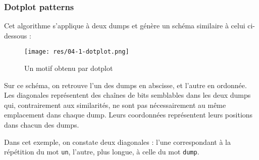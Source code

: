 \subsubsection{Dotplot patterns}

Cet algorithme s'applique à deux dumps et génère un schéma similaire à celui ci-dessous :

\begin{figure}[!h]
  \begin{center}
  \texttt{[image: res/04-1-dotplot.png]}
  \caption{Un motif obtenu par dotplot}
  \label{04-1-dotplot}
  \end{center}
\end{figure}

Sur ce schéma, on retrouve l'un des dumps en abscisse, et l'autre en ordonnée. Les diagonales représentent des chaînes de bits semblables dans les deux dumps qui, contrairement aux similarités, ne sont pas nécessairement au même emplacement dans chaque dump. Leurs coordonnées représentent leurs positions dans chacun des dumps.

Dans cet exemple, on constate deux diagonales : l'une correspondant à la répétition du mot \texttt{un}, l'autre, plus longue, à celle du mot \texttt{dump}.
